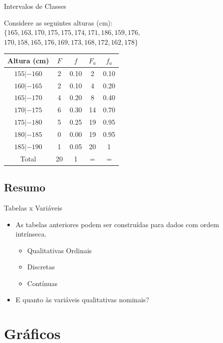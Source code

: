 \documentclass{beamer}
\begin{document}
\begin{frame}{Intervalos de Classes}

  Considere as seguintes alturas (cm):
$ \{ 165,163,170,175,175,174,171,186,159,176,$
$170,158,165,176,169,173,168,172,162,178 \} $

\centering\begin{tabular}{|c|c|c|c|c|}
  \hline
  Altura (cm) & $F$ & $f$ & $F_a$ & $f_a$ \\
  \hline
  $155 |- 160$ & 2 & 0.10 & 2 & 0.10\\%
  $160 |- 165$ & 2 & 0.10 & 4 & 0.20\\%
  $165 |- 170$ & 4 & 0.20 & 8 & 0.40\\%
  $170 |- 175$ & 6 & 0.30 & 14 & 0.70\\%
  $175 |- 180$ & 5 & 0.25 & 19 & 0.95\\%
  $180 |- 185$ & 0 & 0.00 & 19 & 0.95\\%
  $185 |- 190$ & 1 & 0.05 & 20 & 1\\%
  \hline
  \hline
  Total & 20 & 1 & = & =\\
  \hline
\end{tabular}

\end{frame}
\subsection{Resumo}

\begin{frame}{Tabelas x Variáveis}
  \begin{itemize}
  \item As tabelas anteriores podem ser construídas para dados com
    ordem intrínseca.
    \begin{itemize}
    \item Qualitativas Ordinais
    \item Discretas
    \item Contínuas
    \end{itemize}
  \item E quanto às variáveis qualitativas nominais?
  \end{itemize}
  
\end{frame}

\section{Gráficos}
\end{document}
